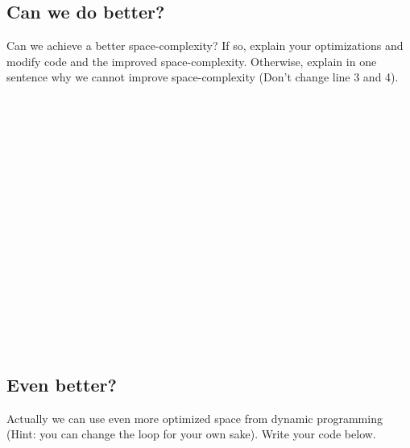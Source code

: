 \documentclass[11pt]{exam}
\begin{document}
\subsection{Can we do better?}


Can we achieve a better space-complexity? If so, explain your optimizations and modify code and
the improved space-complexity. Otherwise, explain in one sentence why we cannot improve space-complexity
(Don't change line 3 and 4).
\begin{solution}
    \\ \hspace*{\fill} \\
    \\ \hspace*{\fill} \\
    \\ \hspace*{\fill} \\
    \\ \hspace*{\fill} \\
    \\ \hspace*{\fill} \\
    \\ \hspace*{\fill} \\
    \\ \hspace*{\fill} \\
    \\ \hspace*{\fill} \\
    
\end{solution}

\subsection{Even better?}
Actually we can use even more optimized space from dynamic programming (Hint: you
can change the loop for your own sake). Write your code below.
\end{document}
